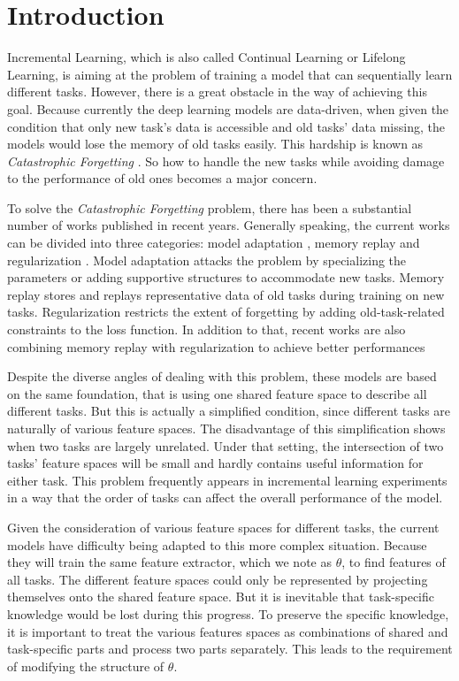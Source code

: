 \documentclass[sigconf,anonymous]{acmart}
\begin{document}
\section{Introduction}
Incremental Learning, which is also called Continual Learning or Lifelong Learning, is aiming at the problem of training a model that can sequentially learn different tasks. However, there is a great obstacle in the way of achieving this goal. Because currently the deep learning models are data-driven, when given the condition that only new task's data is accessible and old tasks' data missing, the models would lose the memory of old tasks easily. This hardship is known as \textit{Catastrophic Forgetting} \cite{french1999catastrophic}. So how to handle the new tasks while avoiding damage to the performance of old ones becomes a major concern.

To solve the \textit{Catastrophic Forgetting} problem, there has been a substantial number of works published in recent years. Generally speaking, the current works can be divided into three categories: model adaptation \cite{aljundi2017expert, serra2018overcoming, mallya2018packnet}, memory replay \cite{rebuffi2017icarl, lopez2017gradient, shin2017continual, iscen2020memory} and regularization \cite{li2017learning, dhar2019learning, kirkpatrick2017overcoming, hou2019learning}. Model adaptation attacks the problem by specializing the parameters or adding supportive structures to accommodate new tasks. Memory replay stores and replays representative data of old tasks during training on new tasks. Regularization restricts the extent of forgetting by adding old-task-related constraints to the loss function. In addition to that, recent works \cite{hu2021distilling, douillard2020podnet} are also combining memory replay with regularization to achieve better performances

Despite the diverse angles of dealing with this problem, these models are based on the same foundation, that is using one shared feature space to describe all different tasks. But this is actually a simplified condition, since different tasks are naturally of various feature spaces. The disadvantage of this simplification shows when two tasks are largely unrelated. Under that setting, the intersection of two tasks' feature spaces will be small and hardly contains useful information for either task. This problem frequently appears in incremental learning experiments in a way that the order of tasks can affect the overall performance of the model. 

Given the consideration of various feature spaces for different tasks, the current models have difficulty being adapted to this more complex situation. Because they will train the same feature extractor, which we note as $\theta$, to find features of all tasks. The different feature spaces could only be represented by projecting themselves onto the shared feature space. But it is inevitable that task-specific knowledge would be lost during this progress. To preserve the specific knowledge, it is important to treat the various features spaces as combinations of shared and task-specific parts and process two parts separately. This leads to the requirement of modifying the structure of $\theta$.
\end{document}
